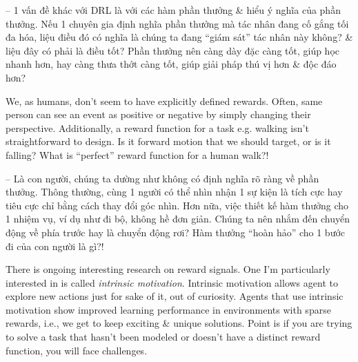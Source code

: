 \documentclass{article}
\begin{document}
\begin{itemize}
\begin{itemize}
\begin{itemize}
            -- 1 vấn đề khác với DRL là với các hàm phần thưởng \& hiểu ý nghĩa của phần thưởng. Nếu 1 chuyên gia định nghĩa phần thưởng mà tác nhân đang cố gắng tối đa hóa, liệu điều đó có nghĩa là chúng ta đang ``giám sát'' tác nhân này không? \& liệu đây có phải là điều tốt? Phần thưởng nên càng dày đặc càng tốt, giúp học nhanh hơn, hay càng thưa thớt càng tốt, giúp giải pháp thú vị hơn \& độc đáo hơn?

            We, as humans, don't seem to have explicitly defined rewards. Often, same person can see an event as positive or negative by simply changing their perspective. Additionally, a reward function for a task e.g. walking isn't straightforward to design. Is it forward motion that we should target, or is it falling? What is ``perfect'' reward function for a human walk?!

            -- Là con người, chúng ta dường như không có định nghĩa rõ ràng về phần thưởng. Thông thường, cùng 1 người có thể nhìn nhận 1 sự kiện là tích cực hay tiêu cực chỉ bằng cách thay đổi góc nhìn. Hơn nữa, việc thiết kế hàm thưởng cho 1 nhiệm vụ, ví dụ như đi bộ, không hề đơn giản. Chúng ta nên nhắm đến chuyển động về phía trước hay là chuyển động rơi? Hàm thưởng ``hoàn hảo'' cho 1 bước đi của con người là gì?!

            There is ongoing interesting research on reward signals. One I'm particularly interested in is called {\it intrinsic motivation}. Intrinsic motivation allows agent to explore new actions just for sake of it, out of curiosity. Agents that use intrinsic motivation show improved learning performance in environments with sparse rewards, i.e., we get to keep exciting \& unique solutions. Point is if you are trying to solve a task that hasn't been modeled or doesn't have a distinct reward function, you will face challenges.


\end{itemize}
\end{itemize}
\end{itemize}
\end{document}
